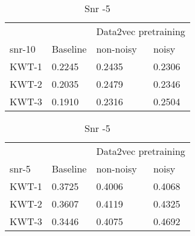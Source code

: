 \begin{table}[ht]
    \centering
    \begin{subtable}[ht]{0.45\textwidth}
        \centering
        \begin{tabular}{@{}llll@{}}
        \toprule
        & & \multicolumn{2}{c}{Data2vec pretraining} \\ \cline{3-4}
        snr-10    & Baseline & non-noisy & noisy \\ \midrule
        KWT-1    & 0.2245  & 0.2435 & 0.2306 \\
        KWT-2    & 0.2035  & 0.2479 & 0.2346 \\
        KWT-3    & 0.1910  & 0.2316 & 0.2504 \\
        \bottomrule
        \end{tabular}
        \caption{Snr -10}
    \end{subtable}
    \hfill
    \begin{subtable}[ht]{0.45\textwidth}
        \centering
        \begin{tabular}{@{}llll@{}}
        \toprule
        & & \multicolumn{2}{c}{Data2vec pretraining} \\ \cline{3-4}
        snr-5    & Baseline & non-noisy & noisy \\ \midrule
        KWT-1    & 0.3725  & 0.4006 & 0.4068 \\
        KWT-2    & 0.3607  & 0.4119 & 0.4325 \\
        KWT-3    & 0.3446  & 0.4075 & 0.4692 \\
        \bottomrule
        \end{tabular}
        \caption{Snr -5}
    \end{subtable}
     
     
    \bigskip



\end{table}
